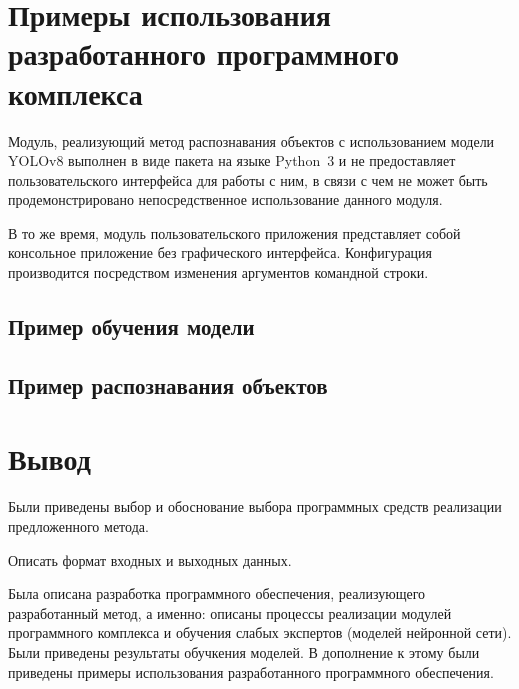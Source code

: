 \section{Примеры использования разработанного программного комплекса}

Модуль, реализующий метод распознавания объектов с использованием модели YOLOv8 выполнен в виде пакета на языке Python~3 и не предоставляет пользовательского интерфейса для работы с ним, в связи с чем не может быть продемонстрировано непосредственное использование данного модуля.

В то же время, модуль пользовательского приложения представляет собой консольное приложение без графического интерфейса. Конфигурация производится посредством изменения аргументов командной строки.

\subsection{Пример обучения модели}



\subsection{Пример распознавания объектов}



\section{Вывод}

Были приведены выбор и обоснование выбора программных средств реализации предложенного метода.

Описать формат входных и выходных данных.

Была описана разработка программного обеспечения, реализующего разработанный метод, а именно: описаны процессы реализации модулей программного комплекса и обучения слабых экспертов (моделей нейронной сети). Были приведены результаты обучкения моделей. В дополнение к этому были приведены примеры использования разработанного программного обеспечения.

